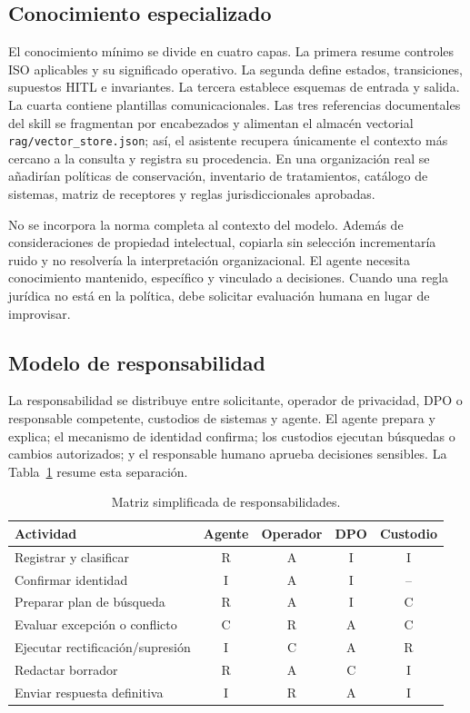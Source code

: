 \documentclass[11pt,a4paper]{article}
\begin{document}
\subsection{Conocimiento especializado}

El conocimiento mínimo se divide en cuatro capas. La primera resume controles ISO aplicables y su significado operativo. La segunda define estados, transiciones, supuestos HITL e invariantes. La tercera establece esquemas de entrada y salida. La cuarta contiene plantillas comunicacionales. Las tres referencias documentales del skill se fragmentan por encabezados y alimentan el almacén vectorial \texttt{rag/vector\_store.json}; así, el asistente recupera únicamente el contexto más cercano a la consulta y registra su procedencia. En una organización real se añadirían políticas de conservación, inventario de tratamientos, catálogo de sistemas, matriz de receptores y reglas jurisdiccionales aprobadas.

No se incorpora la norma completa al contexto del modelo. Además de consideraciones de propiedad intelectual, copiarla sin selección incrementaría ruido y no resolvería la interpretación organizacional. El agente necesita conocimiento mantenido, específico y vinculado a decisiones. Cuando una regla jurídica no está en la política, debe solicitar evaluación humana en lugar de improvisar.

\subsection{Modelo de responsabilidad}

La responsabilidad se distribuye entre solicitante, operador de privacidad, DPO o responsable competente, custodios de sistemas y agente. El agente prepara y explica; el mecanismo de identidad confirma; los custodios ejecutan búsquedas o cambios autorizados; y el responsable humano aprueba decisiones sensibles. La Tabla~\ref{tab:raci} resume esta separación.

\begin{table}[H]
\centering
\caption{Matriz simplificada de responsabilidades.}
\label{tab:raci}
\begin{tabularx}{\textwidth}{X c c c c}
\toprule
Actividad & Agente & Operador & DPO & Custodio \\
\midrule
Registrar y clasificar & R & A & I & I \\
Confirmar identidad & I & A & I & -- \\
Preparar plan de búsqueda & R & A & I & C \\
Evaluar excepción o conflicto & C & R & A & C \\
Ejecutar rectificación/supresión & I & C & A & R \\
Redactar borrador & R & A & C & I \\
Enviar respuesta definitiva & I & R & A & I \\
\bottomrule
\end{tabularx}
\end{table}
\end{document}

